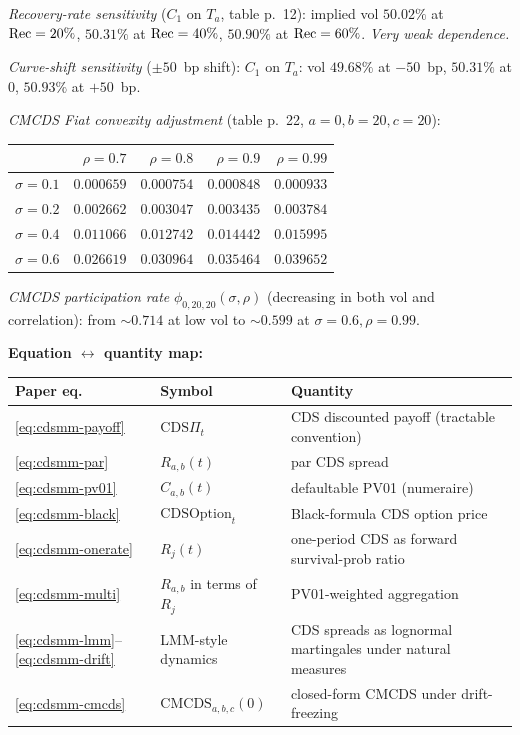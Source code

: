 \documentclass[11pt,a4paper]{article}
\begin{document}
\begin{validation}
\textit{Recovery-rate sensitivity} ($C_1$ on $T_a$, table p.~12):
implied vol $50.02\%$ at $\mathrm{Rec}=20\%$, $50.31\%$ at $\mathrm{Rec}=40\%$,
$50.90\%$ at $\mathrm{Rec}=60\%$. \emph{Very weak dependence.}

\smallskip
\textit{Curve-shift sensitivity} ($\pm 50$~bp shift):
$C_1$ on $T_a$: vol $49.68\%$ at $-50$~bp, $50.31\%$ at $0$,
$50.93\%$ at $+50$~bp.

\smallskip
\textit{CMCDS Fiat convexity adjustment} (table p.~22, $a=0, b=20, c=20$):
\begin{tabular}{@{}lrrrr@{}}
\toprule
                                         & $\rho=0.7$ & $\rho=0.8$ & $\rho=0.9$ & $\rho=0.99$ \\
\midrule
$\sigma=0.1$                             & $0.000659$ & $0.000754$ & $0.000848$ & $0.000933$ \\
$\sigma=0.2$                             & $0.002662$ & $0.003047$ & $0.003435$ & $0.003784$ \\
$\sigma=0.4$                             & $0.011066$ & $0.012742$ & $0.014442$ & $0.015995$ \\
$\sigma=0.6$                             & $0.026619$ & $0.030964$ & $0.035464$ & $0.039652$ \\
\bottomrule
\end{tabular}
\smallskip

\textit{CMCDS participation rate} $\phi_{0,20,20}(\sigma, \rho)$
(decreasing in both vol and correlation): from $\sim 0.714$ at low
vol to $\sim 0.599$ at $\sigma = 0.6, \rho = 0.99$.

\textbf{Equation $\leftrightarrow$ quantity map:}

\smallskip
\begin{tabular}{@{}p{3.0cm}p{4.0cm}p{6.5cm}@{}}
\toprule
Paper eq.                                 & Symbol                          & Quantity \\
\midrule
\eqref{eq:cdsmm-payoff}                   & $\text{CDS}\Pi_t$               & CDS discounted payoff (tractable convention) \\
\eqref{eq:cdsmm-par}                      & $R_{a,b}(t)$                    & par CDS spread \\
\eqref{eq:cdsmm-pv01}                     & $C_{a,b}(t)$                    & defaultable PV01 (numeraire) \\
\eqref{eq:cdsmm-black}                    & $\text{CDSOption}_t$            & Black-formula CDS option price \\
\eqref{eq:cdsmm-onerate}                  & $R_j(t)$                        & one-period CDS as forward survival-prob ratio \\
\eqref{eq:cdsmm-multi}                    & $R_{a,b}$ in terms of $R_j$     & PV01-weighted aggregation \\
\eqref{eq:cdsmm-lmm}--\eqref{eq:cdsmm-drift} & LMM-style dynamics            & CDS spreads as lognormal martingales under natural measures \\
\eqref{eq:cdsmm-cmcds}                    & $\text{CMCDS}_{a,b,c}(0)$       & closed-form CMCDS under drift-freezing \\
\bottomrule
\end{tabular}
\smallskip


\end{validation}
\end{document}
